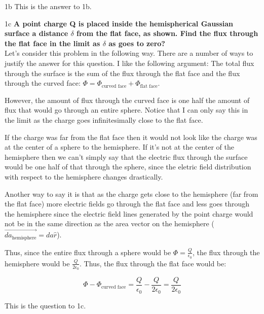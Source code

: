 \begin{homeworkProblem}[Quiz 3, Pr. 1]
\begin{homeworkSection}{1b}
        This is the answer to 1b.
    \end{homeworkSection}

    \begin{homeworkSection}{1c}
        \textbf{A point charge Q is placed inside the hemispherical
        Gaussian surface a distance $\delta$ from the flat face, as
        shown. Find the flux through the flat face in the limit as
        $\delta$ as goes to zero?}
        \\

        Let's consider this problem in the following way. There are a
        number of ways to justify the answer for this question. I like
        the following argument: The total flux through the surface is
        the sum of the flux through the flat face and the flux through
        the curved face: $\Phi = \Phi_{\text{curved face}}+
        \Phi_{\text{flat face}} $.
        
        However, the amount of flux through
        the curved face is one half the amount of flux that would go
        through an entire sphere. Notice that I can only say this in the
        limit as the charge goes infinitesimally close to the flat face.
       
        If the charge was far from the flat face then it would not look
        like the charge was at the center of a sphere to the hemisphere.
        If it's not at the center of the hemisphere then we can't simply
        say that the electric flux through the surface would be one half
        of that through the sphere, since the eletric field distribution
        with respect to the hemisphere changes drastically.

        Another way to say it is that as the charge gets close to the
        hemisphere (far from the flat face) more electric fields go
        through the flat face and less goes through the hemisphere since
        the electric field lines generated by the point charge would not
        be in the same direction as the area vector on the hemisphere
        ($\vec{da_{\text{hemisphere}}} = da \hat{r}$).

        Thus, since the entire flux through a sphere would be $\Phi =
        \frac{Q}{\epsilon_0}$, the flux through the hemisphere would be
        $\frac{Q}{2\epsilon_0}$. Thus, the flux through the flat face
        would be:

        \[ \Phi - \Phi_{\text{curved face}} = \frac{Q}{\epsilon_0} -
        \frac{Q}{2\epsilon_0} = \frac{Q}{2\epsilon_0} \]

        This is the question to 1c.

    \end{homeworkSection}
\end{homeworkProblem}
